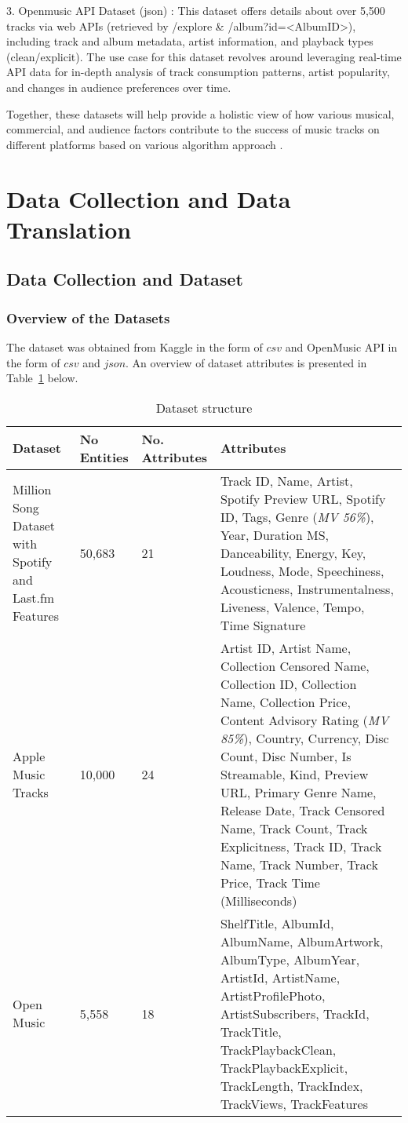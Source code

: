 \documentclass[runningheads]{llncs}
\begin{document}
3. Openmusic API Dataset (json) \cite{open_music}: This dataset offers details about over 5,500 tracks via web APIs (retrieved by /explore \& /album?id=<AlbumID>), including track and album metadata, artist information, and playback types (clean/explicit). The use case for this dataset revolves around leveraging real-time API data for in-depth analysis of track consumption patterns, artist popularity, and changes in audience preferences over time.

Together, these datasets will help provide a holistic view of how various musical, commercial, and audience factors contribute to the success of music tracks on different platforms based on various algorithm approach \cite{doan_principles_2012}.

\section{Data Collection and Data Translation}
\subsection{Data Collection and Dataset}
\subsubsection{Overview of the Datasets}
The dataset was obtained from Kaggle in the form of $csv$ and OpenMusic API in the form of $csv$ and $json$. An overview of dataset attributes is presented in Table~\ref{tab1} below.

\begin{table}[h]
	\renewcommand{\arraystretch}{1.5}
	\caption{Dataset structure}\label{tab1}
	\centering
	\begin{tabular}{p{3cm} p{3cm}p{3cm}p{5cm}}
		\toprule
		\textbf{Dataset} &  \textbf{ No Entities}&\textbf{No. Attributes}& \textbf{Attributes}\\
		\hline
		\hline
		Million Song Dataset with Spotify and Last.fm Features&50,683&21&Track ID, Name, Artist, Spotify Preview URL, Spotify ID, Tags, Genre (\emph{MV 56\%}), Year, Duration MS, Danceability, Energy, Key, Loudness, Mode, Speechiness, Acousticness, Instrumentalness, Liveness, Valence, Tempo, Time Signature\\
		Apple Music Tracks&10,000&24
		&Artist ID, Artist Name, Collection Censored Name, Collection ID, Collection Name, Collection Price, Content Advisory Rating (\emph{MV 85\%}), Country, Currency, Disc Count, Disc Number, Is Streamable, Kind, Preview URL, Primary Genre Name, Release Date, Track Censored Name, Track Count, Track Explicitness, Track ID, Track Name, Track Number, Track Price, Track Time (Milliseconds)\\
		Open Music&5,558&18&ShelfTitle, AlbumId, AlbumName, AlbumArtwork, AlbumType, AlbumYear, ArtistId, ArtistName, ArtistProfilePhoto, ArtistSubscribers, TrackId, TrackTitle, TrackPlaybackClean, TrackPlaybackExplicit, TrackLength, TrackIndex, TrackViews, TrackFeatures\\
		\hline
		\hline
	\end{tabular}
\end{table}
\end{document}
